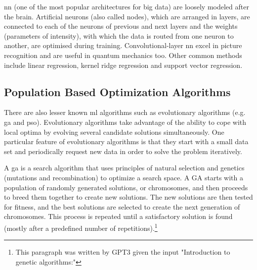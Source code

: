 \Gls{nn} (one of the most popular architectures for big data\cite{Chiroma2019}) are loosely modeled after the brain\cite{bishop1994neural}.
Artificial neurons (also called nodes), which are arranged in layers, 
are connected to each of the neurons of previous and next layers
and the weights (parameters of intensity), with which the data is routed from one neuron to another, 
are optimised during training. 
%
Convolutional-layer \gls{nn} excel in picture recognition\cite{Lecun1995conv} and are useful in quantum mechanics too\cite{westermayr2020combining}.
Other common methods include linear regression, kernel ridge regression and support vector regression.



\subsection{Population Based Optimization Algorithms}

There are also lesser known \gls{ml} algorithms such as 
evolutionary algorithms (e.g. \gls{ga} and \gls{pso}).
Evolutionary algorithms take advantage of the ability to cope with local optima by evolving several candidate solutions simultaneously\cite{villanova2010function}.
%
One particular feature of evolutionary algorithms is that they start with a small data set
and periodically request new data in order to solve the problem iteratively.

A \gls{ga} is a search algorithm that uses principles of natural selection and genetics (mutations and recombination) to optimize a search space. A GA starts with a population of randomly generated solutions, or chromosomes, and then proceeds to breed them together to create new solutions. The new solutions are then tested for fitness, and the best solutions are selected to create the next generation of chromosomes. This process is repeated until a satisfactory solution is found (mostly after a predefined number of repetitions).\footnote{This paragraph was written by GPT3\cite{Liu2021gpt} given the input "Introduction to genetic algorithms:"}

\iffalse
\Gls{ga} uses a starting population of size $p$ ($p \in$ \td{N$^+$}) where each experiment (or data point) 
is represented by a fixed size genome of 0's and 1's in most cases. 
Each individual is then given a fitness value. 
New genomes are added and discarded from the population using 
selection, mutation and crossover operations.
\fi

